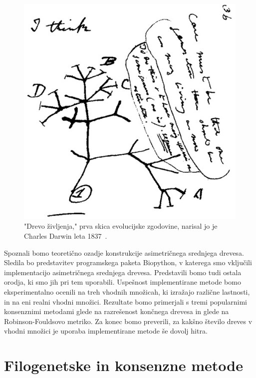 \documentclass[a4paper, 12pt]{book}
\begin{document}
\begin{figure}
	\begin{center}
		\includegraphics[scale=0.45]{gfx/darwin_tree.jpg}
	\end{center}
	\caption{
		"Drevo življenja," prva skica evolucijske zgodovine, narisal jo je 
		Charles Darwin leta 1837~\cite{cd}.
	}
	\label{img-darwin-tree}
\end{figure}

Spoznali bomo teoretično ozadje konstrukcije asimetričnega srednjega drevesa.
Sledila bo predstavitev programskega paketa Biopython, v katerega smo
vključili implementacijo asimetričnega srednjega drevesa. Predstavili bomo tudi ostala orodja, ki smo
jih pri tem uporabili. Uspešnost implementirane metode bomo eksperimentalno ocenili
na treh vhodnih množicah, ki izražajo različne lastnosti, in na eni realni vhodni 
množici. Rezultate bomo primerjali s tremi popularnimi konsenznimi metodami glede
na razrešenost končnega drevesa in glede na Robinson-Fouldsovo metriko. 
Za  konec bomo preverili, za kakšno število dreves v vhodni množici je uporaba
implementirane metode še dovolj hitra.


\chapter{Filogenetske in konsenzne metode}
\end{document}
